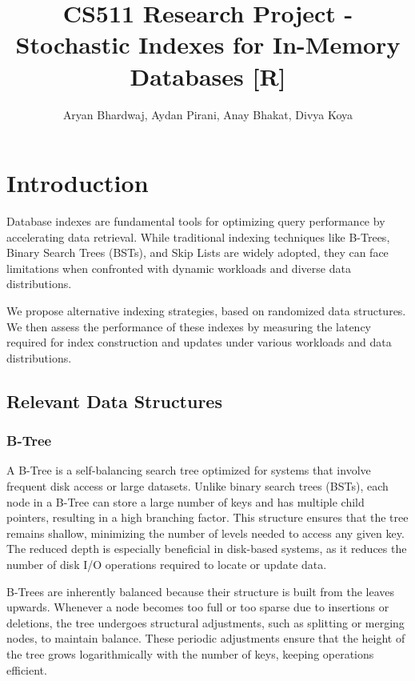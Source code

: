 \documentclass[sigconf]{acmart}
\begin{document}
\title{CS511 Research Project - Stochastic Indexes for In-Memory Databases [R]}

\author{Aryan Bhardwaj, Aydan Pirani, Anay Bhakat, Divya Koya}


\maketitle

\section{Introduction}


Database indexes are fundamental tools for optimizing query performance by accelerating data retrieval. While traditional indexing techniques like B-Trees, Binary Search Trees (BSTs), and Skip Lists are widely adopted, they can face limitations when confronted with dynamic workloads and diverse data distributions.

We propose alternative indexing strategies, based on randomized data structures. We then assess the performance of these indexes by measuring the latency required for index construction and updates under various workloads and data distributions.

\subsection{Relevant Data Structures}

\subsubsection{B-Tree}
A B-Tree is a self-balancing search tree optimized for systems that involve frequent disk access or large datasets. Unlike binary search trees (BSTs), each node in a B-Tree can store a large number of keys and has multiple child pointers, resulting in a high branching factor. This structure ensures that the tree remains shallow, minimizing the number of levels needed to access any given key. The reduced depth is especially beneficial in disk-based systems, as it reduces the number of disk I/O operations required to locate or update data.

B-Trees are inherently balanced because their structure is built from the leaves upwards. Whenever a node becomes too full or too sparse due to insertions or deletions, the tree undergoes structural adjustments, such as splitting or merging nodes, to maintain balance. These periodic adjustments ensure that the height of the tree grows logarithmically with the number of keys, keeping operations efficient.
\end{document}
